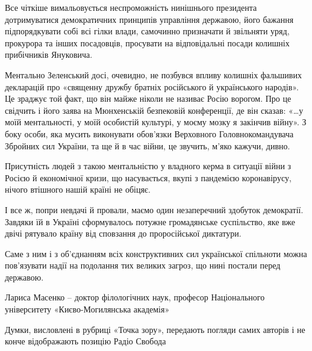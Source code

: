 Все чіткіше вимальовується неспроможність нинішнього президента дотримуватися
демократичних принципів управління державою, його бажання підпорядкувати собі
всі гілки влади, самочинно призначати й звільняти уряд, прокурора та інших
посадовців, просувати на відповідальні посади колишніх прибічників Януковича.

Ментально Зеленський досі, очевидно, не позбувся впливу колишніх фальшивих
декларацій про «священну дружбу братніх російського й українського народів». Це
зраджує той факт, що він майже ніколи не називає Росію ворогом. Про це свідчить
і його заява на Мюнхенській безпековій конференції, де він сказав: «…у моїй
ментальності, у моїй особистій культурі, у моєму мозку я закінчив війну». З
боку особи, яка мусить виконувати обов’язки Верховного Головнокомандувача
Збройних сил України, та ще й в час війни, це звучить, м’яко кажучи, дивно.

Присутність людей з такою ментальністю у владного керма в ситуації війни з
Росією й економічної кризи, що насувається, вкупі з пандемією коронавірусу,
нічого втішного нашій країні не обіцяє.

І все ж, попри невдачі й провали, маємо один незаперечний здобуток демократії.
Завдяки їй в Україні сформувалось потужне громадянське суспільство, яке вже
двічі рятувало країну від сповзання до проросійської диктатури.

Саме з ним і з об’єднанням всіх конструктивних сил української спільноти можна
пов’язувати надії на подолання тих великих загроз, що нині постали перед
державою.

Лариса Масенко – доктор філологічних наук, професор Національного університету
«Києво-Могилянська академія»

Думки, висловлені в рубриці «Точка зору», передають погляди самих авторів і не
конче відображають позицію Радіо Свобода



